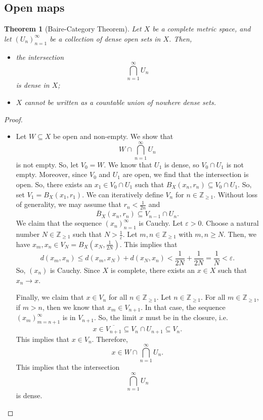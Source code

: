 \documentclass[a4paper, openany]{memoir}
\theoremstyle{definition}
\theoremstyle{plain}
\newtheorem{theorem}[definition]{Theorem}
\begin{document}
    \subsection{Open maps}
    \begin{theorem}[Baire-Category Theorem]
        Let $X$ be a complete metric space, and let $(U_n)_{n=1}^\infty$ be a collection of dense open sets in $X$. Then,
        \begin{itemize}
            \item the intersection
            \[\bigcap_{n=1}^\infty U_n\]
            is dense in $X$;
            \item $X$ cannot be written as a countable union of nowhere dense sets.
        \end{itemize}
    \end{theorem}
    \begin{proof}
        \hspace*{0pt}
        \begin{itemize}
            \item Let $W \subseteq X$ be open and non-empty. We show that
            \[W \cap \bigcap_{n=1}^\infty U_n\]
            is not empty. So, let $V_0 = W$. We know that $U_1$ is dense, so $V_0 \cap U_1$ is not empty. Moreover, since $V_0$ and $U_1$ are open, we find that the intersection is open. So, there exists an $x_1 \in V_0 \cap U_1$ such that $B_X(x_n, r_n) \subseteq V_0 \cap U_1$. So, set $V_1 = B_X(x_1, r_1)$. We can iteratively define $V_n$ for $n \in \mathbb{Z}_{\geq 1}$. Without loss of generality, we may assume that $r_n < \frac{1}{2n}$ and 
            \[\overline{B}_X(x_n, r_n) \subseteq V_{n-1} \cap U_n.\]
            We claim that the sequence $(x_n)_{n=1}^\infty$ is Cauchy. Let $\varepsilon > 0$. Choose a natural number $N \in \mathbb{Z}_{\geq 1}$ such that $N > \frac{1}{\varepsilon}$. Let $m, n \in \mathbb{Z}_{\geq 1}$ with $m, n \geq N$. Then, we have $x_m, x_n \in V_N = B_X(x_N, \frac{1}{2N})$. This implies that
            \[d(x_m, x_n) \leq d(x_m, x_N) + d(x_N, x_n) < \frac{1}{2N} + \frac{1}{2N} = \frac{1}{N} < \varepsilon.\]
            So, $(x_n)$ is Cauchy. Since $X$ is complete, there exists an $x \in X$ such that $x_n \to x$. 

            \noindent Finally, we claim that $x \in V_n$ for all $n \in \mathbb{Z}_{\geq 1}$. Let $n \in \mathbb{Z}_{\geq 1}$. For all $m \in \mathbb{Z}_{\geq 1}$, if $m > n$, then we know that $x_m \in V_{n+1}$. In that case, the sequence $(x_m)_{m=n+1}^\infty$ is in $V_{n+1}$. So, the limit $x$ must be in the closure, i.e.
            \[x \in \overline{V_{n+1}} \subseteq V_n \cap U_{n+1} \subseteq V_n.\]
            This implies that $x \in V_n$. Therefore,
            \[x \in W \cap \bigcap_{n=1}^\infty U_n.\]
            This implies that the intersection 
            \[\bigcap_{n=1}^\infty U_n\]
            is dense.
            

\end{itemize}
\end{proof}
\end{document}
